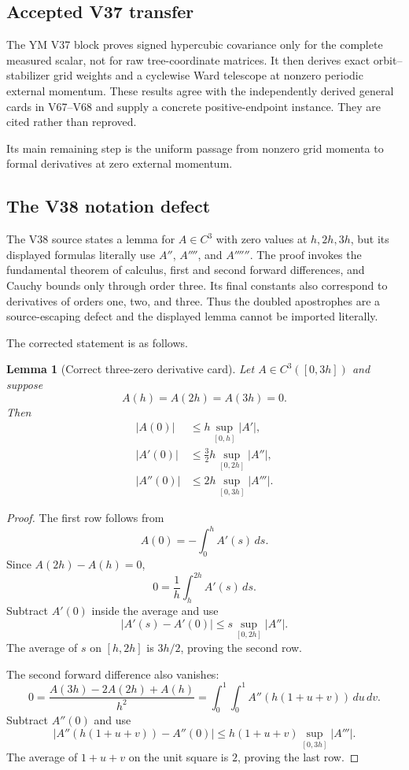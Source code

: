 \documentclass[11pt]{article}
\newtheorem{lemma}[theorem]{Lemma}
\begin{document}
\subsection{Accepted V37 transfer}

The YM V37 block proves signed hypercubic covariance only for the
complete measured scalar, not for raw tree-coordinate matrices.  It
then derives exact orbit--stabilizer grid weights and a cyclewise Ward
telescope at nonzero periodic external momentum.  These results agree
with the independently derived general cards in V67--V68 and supply a
concrete positive-endpoint instance.  They are cited rather than
reproved.

Its main remaining step is the uniform passage from nonzero grid
momenta to formal derivatives at zero external momentum.

\subsection{The V38 notation defect}

The V38 source states a lemma for \(A\in C^3\) with zero values at
\(h,2h,3h\), but its displayed formulas literally use
\(A''\), \(A''''\), and \(A''''''\).  The proof invokes the fundamental
theorem of calculus, first and second forward differences, and Cauchy
bounds only through order three.  Its final constants also correspond
to derivatives of orders one, two, and three.  Thus the doubled
apostrophes are a source-escaping defect and the displayed lemma cannot
be imported literally.

The corrected statement is as follows.

\begin{lemma}[Correct three-zero derivative card]
\label{lem:v11v70-three-zero}
Let \(A\in C^3([0,3h])\) and suppose
\[
                              A(h)=A(2h)=A(3h)=0.              \tag{70.2}
\]
Then
\[
\begin{split}
 |A(0)|&\le h\sup_{[0,h]}|A'|,\\
 |A'(0)|&\le\frac32h\sup_{[0,2h]}|A''|,\\
 |A''(0)|&\le2h\sup_{[0,3h]}|A'''|.                          \tag{70.3}
\end{split}
\]
\end{lemma}

\begin{proof}
The first row follows from
\[
                              A(0)=-\int_0^hA'(s)\,ds.
\]
Since \(A(2h)-A(h)=0\),
\[
                              0=\frac1h\int_h^{2h}A'(s)\,ds.
\]
Subtract \(A'(0)\) inside the average and use
\[
                              |A'(s)-A'(0)|
                        \le s\sup_{[0,2h]}|A''|.
\]
The average of \(s\) on \([h,2h]\) is \(3h/2\), proving the second row.

The second forward difference also vanishes:
\[
 0=\frac{A(3h)-2A(2h)+A(h)}{h^2}
   =\int_0^1\int_0^1A''(h(1+u+v))\,du\,dv.                  \tag{70.4}
\]
Subtract \(A''(0)\) and use
\[
 |A''(h(1+u+v))-A''(0)|
 \le h(1+u+v)\sup_{[0,3h]}|A'''|.
\]
The average of \(1+u+v\) on the unit square is \(2\), proving the last
row.
\end{proof}
\end{document}
